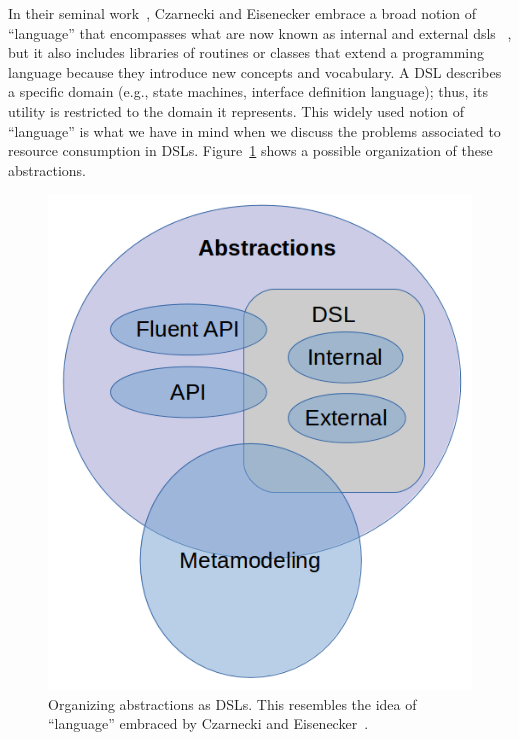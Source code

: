In their seminal work~\cite{Czarnecki2000}, Czarnecki and Eisenecker embrace a broad notion of ``language'' that encompasses what are now known as internal and external \glspl{dsl} ~\cite{Fowler:2010:DSL:1809745}, but it also includes libraries of routines or classes that extend a programming language because they introduce new concepts and vocabulary.
A DSL describes a specific domain (e.g., state machines, interface definition language); thus, its utility is restricted to the domain it represents.
This widely used notion of ``language'' is what we have in mind when we discuss the problems associated to resource consumption in DSLs.
Figure~\ref{fig:dsl-hierarchy} shows a possible organization of these abstractions.

\begin{figure}
\centering
\includegraphics[scale=0.5]{./chapter2/fig/dsl-hierarchy.png}
\caption{Organizing abstractions as DSLs. This resembles the idea of ``language'' embraced by Czarnecki and Eisenecker~\cite{Czarnecki2000}.}\label{fig:dsl-hierarchy}
\end{figure}

